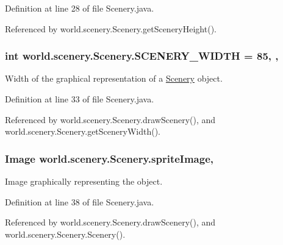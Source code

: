 Definition at line 28 of file Scenery.\-java.



Referenced by world.\-scenery.\-Scenery.\-get\-Scenery\-Height().

\hypertarget{a00024_affb047c028883c6d069a03ef0f1caeb8}{
\subsubsection[{S\-C\-E\-N\-E\-R\-Y\-\_\-\-W\-I\-D\-T\-H}]{\setlength{\rightskip}{0pt plus 5cm}int world.\-scenery.\-Scenery.\-S\-C\-E\-N\-E\-R\-Y\-\_\-\-W\-I\-D\-T\-H = 85\hspace{0.3cm}{\ttfamily [static]}, {\ttfamily [protected]}, {\ttfamily [inherited]}}}\label{a00024_affb047c028883c6d069a03ef0f1caeb8}


Width of the graphical representation of a \hyperlink{a00024}{Scenery} object. 



Definition at line 33 of file Scenery.\-java.



Referenced by world.\-scenery.\-Scenery.\-draw\-Scenery(), and world.\-scenery.\-Scenery.\-get\-Scenery\-Width().

\hypertarget{a00024_a512d9c0a154e6843389e343d80843326}{
\subsubsection[{sprite\-Image}]{\setlength{\rightskip}{0pt plus 5cm}Image world.\-scenery.\-Scenery.\-sprite\-Image\hspace{0.3cm}{\ttfamily [protected]}, {\ttfamily [inherited]}}}\label{a00024_a512d9c0a154e6843389e343d80843326}


Image graphically representing the object. 



Definition at line 38 of file Scenery.\-java.



Referenced by world.\-scenery.\-Scenery.\-draw\-Scenery(), and world.\-scenery.\-Scenery.\-Scenery().

